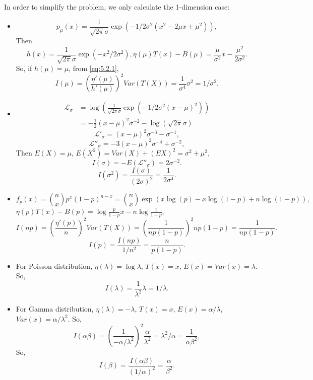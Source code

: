 \begin{solution}
    In order to simplify the problem, we only calculate the 1-dimension case: 
    \begin{itemize}
        \item \[
            p_\mu(x)=\frac{1}{\sqrt{2\pi}\sigma}\exp\left(-1/2\sigma^2(x^2-2\mu x+\mu^2)\right), 
        \]
        Then 
        \[
            h(x)=\frac{1}{\sqrt{2\pi}\sigma}\exp\left(-x^2/2\sigma^2\right), \eta(\mu) T(x)-B(\mu)=\frac{\mu}{\sigma^2}x-\frac{\mu^2}{2\sigma^2}. 
        \] 
        So, if $h(\mu)=\mu$, from \ref{eq:5.2.1}, 
        \[
            I(\mu)=\left(\frac{\eta'(\mu)}{h'(\mu)}\right)^2Var(T(X))=\frac{1}{\sigma^4}\sigma^2=1/\sigma^2. 
        \]
        \item \[
        \begin{aligned}
            \mathcal{L}_\sigma&=\log\left(\frac{1}{\sqrt{2\pi}\sigma}\exp\left(-1/2\sigma^2(x-\mu)^2\right)\right)\\
            &=-\frac{1}{2}\left(x-\mu\right)^2\sigma^{-2}-\log(\sqrt{2\pi}\sigma)
        \end{aligned}
        \]
        \[
            \mathcal{L}'_\sigma = \left(x-\mu\right)^2\sigma^{-3}-\sigma^{-1}, 
        \]
        \[
            \mathcal{L}''_\sigma = -3\left(x-\mu\right)^2\sigma^{-4}+\sigma^{-2}, 
        \]
        Then $E(X)=\mu$, $E(X^2)=Var(X)+(EX)^2=\sigma^2+\mu^2$, 
        \[
            I(\sigma)=-E(\mathcal{L''_\sigma})=2\sigma^{-2}. 
        \]
        \[
            I(\sigma^2)=\frac{I(\sigma)}{(2\sigma)^2}=\frac{1}{2\sigma^4}. 
        \]
        \item \[
            f_p(x)=\binom{n}{x}p^x(1-p)^{n-x}=\binom{n}{x}\exp\left(x\log(p)-x\log(1-p)+n\log(1-p)\right), 
        \]
        $\eta(p)T(x)-B(p)=\log\frac{p}{1-p}x-n\log\frac{1}{1-p}$, 
        \[
            I(np)=\left(\frac{\eta'(p)}{n}\right)^2Var(T(X))=\left(\frac{1}{np(1-p)}\right)^2np(1-p)=\frac{1}{np(1-p)}. 
        \]
        \[
            I(p)=\frac{I(np)}{1/n^2}=\frac{n}{p(1-p)}. 
        \]
        \item For Poisson distribution, $\eta(\lambda)=\log \lambda$, $T(x)=x$, $E(x)=Var(x)=\lambda$. So, 
        \[
            I(\lambda)=\frac{1}{\lambda^2}\lambda=1/\lambda. 
        \]
        \item For Gamma distribution, $\eta(\lambda)=-\lambda$, $T(x)=x$, $E(x)=\alpha/\lambda$, $Var(x)=\alpha/\lambda^2$. So,
        \[
            I(\alpha\beta)=\left(\frac{1}{-\alpha/\lambda^2}\right)^2\frac{\alpha}{\lambda^2}=\lambda^2/\alpha=\frac{1}{\alpha\beta^2}, 
        \]
        So, \[
            I(\beta)=\frac{I(\alpha\beta)}{(1/\alpha)^2}=\frac{\alpha}{\beta^2}. 
        \]
    \end{itemize}
\end{solution}

